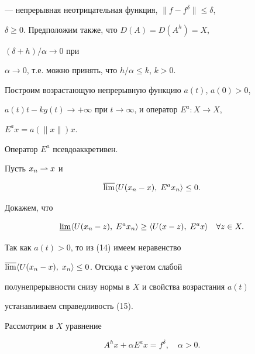 --- непрерывная неотрицательная функция, $\|f-f^\delta\|\le\delta$, 


$\delta\ge 0$. Предположим также, что $D(A)=D(A^h)=X$,


$(\delta+h)/\alpha\to 0$ при 


$\alpha\to 0$, т.е. можно принять, что $h/\alpha\le k$, $k>0$. 


Построим возрастающую непрерывную функцию $a(t)$, $a(0)>0$, 


$a(t)t-kg(t)\to+\infty$ при $t\to \infty$, и оператор $E^a:X\to X$, 


$E^ax=a(\|x\|)x$. 


 


\begin{lem} Оператор $E^a$ псевдоаккретивен. 


\end{lem} 


 


\begin{pf} Пусть $x_n\rightharpoonup x$ и 


\begin{equation} 


\overline{\lim}\la U(x_n-x),\;E^ax_n\ra\le 0. 


\end{equation} 


Докажем, что 


\begin{equation} 


\underline{\lim}\la U(x_n-z),\;E^ax_n\ra \ge 


\la U(x-z),\;E^ax\ra\quad \forall z\in X. 


\end{equation} 


Так как $a(t)>0$, то из (14) имеем неравенство 


$\overline{\lim}\langle U(x_n-x),\;x_n\rangle\le 0$. Отсюда с учетом слабой 


полунепрерывности снизу нормы в $X$ и свойства возрастания $a(t)$ 


устанавливаем справедливость (15). 


\end{pf} 


 


Рассмотрим в $X$ уравнение 


\begin{equation} 


A^hx+\alpha E^ax=f^\delta,\quad \alpha >0. 


\end{equation} 



